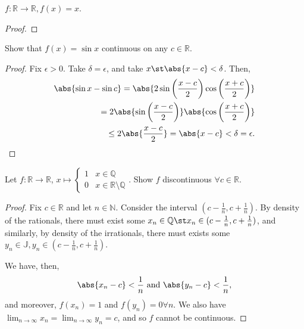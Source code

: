 \documentclass[12pt]{article}
\begin{document}
\begin{example}
  $f: \mathbb{R} \to \mathbb{R}, f(x) = x$.
  \begin{proof}
  \end{proof}
\end{example}

\begin{example}[$f(x)  = \sin x$]
  Show that $f(x) = \sin x$ continuous on any $c \in \mathbb{R}$.
  \begin{proof}
    Fix $\epsilon > 0$. Take $\delta = \epsilon$, and take $x \st \abs{x - c} < \delta$. Then, \begin{align*}
      \abs{\sin x - \sin c} = \abs{2 \sin \left(\frac{x - c}{2}\right) \cos \left(\frac{x+c}{2} \right)}\\
      = 2 \abs{\sin \left(\frac{x - c}{2}\right)}\abs{\cos \left(\frac{x+c}{2} \right)}\\
      \leq 2\abs{\frac{x-c}{2}} = \abs{x - c} < \delta = \epsilon.
    \end{align*}
  \end{proof}
\end{example}

\begin{example}
  Let $f: \mathbb{R} \to \mathbb{R}$, $x\mapsto\begin{cases}
    1 & x \in \mathbb{Q}\\
    0 & x \in \mathbb{R}\setminus\mathbb{Q}
  \end{cases}$. Show $f$ discontinuous $\forall c \in \mathbb{R}$.
  \begin{proof}
    Fix $c \in \mathbb{R}$ and let $n \in \mathbb{N}$. Consider the interval $(c - \frac{1}{n}, c + \frac{1}{n})$. By density of the rationals, there must exist some $x_n \in \mathbb{Q} \st x_n \in (c - \frac{1}{n}, c + \frac{1}{n})$, and similarly, by density of the irrationals, there must exists some $y_n \in \mathbb{J}, y_n \in (c - \frac{1}{n}, c + \frac{1}{n})$.

    We have, then, \[
    \abs{x_n - c}  < \frac{1}{n} \text{ and } \abs{y_n - c} < \frac{1}{n}, 
    \]
    and moreover, $f(x_n) = 1$ and $f(y_n) = 0 \forall n$. We also have $\lim_{n\to\infty} x_n = \lim_{n\to\infty} y_n = c$, and so $f$ cannot be continuous.
  \end{proof}
\end{example}
\end{document}
